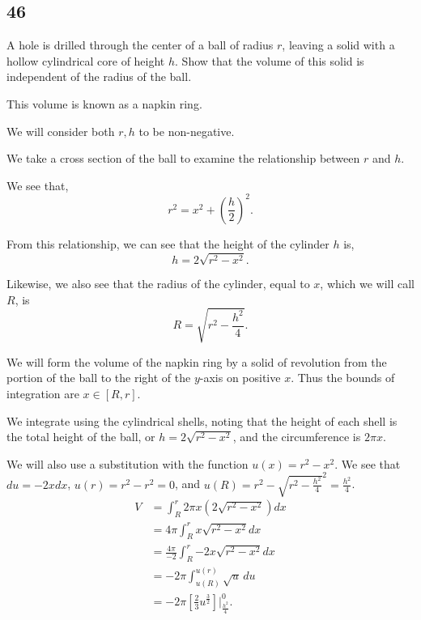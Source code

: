 \documentclass[../hw6.tex]{subfiles}
\begin{document}
\subsection*{46}
A hole is drilled through the center of a ball of radius $r$, leaving a solid with a hollow cylindrical core of height $h$. Show that the volume of this solid is independent of the radius of the ball.

This volume is known as a napkin ring.

We will consider both $r,h$ to be non-negative.

We take a cross section of the ball to examine the relationship between $r$ and $h$.

\begin{figure*}[ht]
\centering    
{}  
\end{figure*}

We see that, \[r^2=x^2+{\left( \frac{h}{2} \right)}^2.\]

From this relationship, we can see that the height of the cylinder $h$ is, \[h=2\sqrt{r^2-x^2}.\]

Likewise, we also see that the radius of the cylinder, equal to $x$, which we will call $R$, is \[R=\sqrt{r^2-\frac{h^2}{4}}.\]

We will form the volume of the napkin ring by a solid of revolution from the portion of the ball to the right of the $y$-axis on positive $x$. Thus the bounds of integration are $x\in[R,r]$.

We integrate using the cylindrical shells, noting that the height of each shell is the total height of the ball, or $h=2\sqrt{r^2-x^2}$, and the circumference is $2\pi x$.

We will also use a substitution with the function $u(x) = r^2-x^2$. We see that $du=-2xdx$, $u(r)=r^2-r^2=0$, and $u(R)=r^2-{\sqrt{r^2-\frac{h^2}{4}}}^2=\frac{h^2}{4}$.
\begin{align*}
    V &= \int_{R}^{r} 2\pi x \left( 2\sqrt{r^2-x^2} \right) dx \\
    &= 4\pi \int_{R}^{r} x \sqrt{r^2-x^2} dx \\
    &= \frac{4\pi}{-2} \int_{R}^{r} {-2x} \sqrt{r^2-x^2} dx \\
    &= {-2\pi} \int_{u(R)}^{u(r)} \sqrt{u} \, du \\
    &= {-2\pi} \left[ \frac{2}{3} u^{\frac{3}{2}} \right] \Bigg\vert_{\frac{h^2}{4}}^{0}.
\end{align*}
\end{document}
